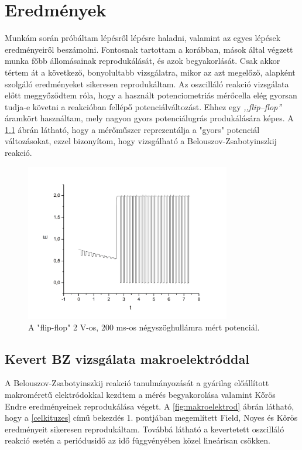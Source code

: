 \chapter{Eredmények}
\pagestyle{headings}

\def\s{0.5}
Munkám során próbáltam lépésről lépésre haladni, valamint az egyes lépések eredményeiről beszámolni. Fontosnak tartottam a korábban, mások által végzett munka főbb állomásainak reprodukálását, és azok begyakorlását. Csak akkor tértem át a következő, bonyolultabb vizsgálatra, mikor az azt megelőző, alapként szolgáló eredményeket sikeresen reprodukáltam. Az oszcilláló reakció vizsgálata előtt meggyőződtem róla, hogy a használt potenciometriás mérőcella elég gyorsan tudja-e követni a reakcióban fellépő potenciálváltozást. Ehhez egy \emph{,,flip--flop''} áramkört használtam, mely nagyon gyors potenciálugrás produkálására képes. A \ref{fig:square} ábrán látható, hogy a mérőműszer reprezentálja a "gyors" potenciál változásokat, ezzel bizonyítom, hogy vizsgálható a Belouszov-Zsabotyinszkij reakció.

\begin{figure}
\centering
\includegraphics[width=0.8\textwidth]{img/square.jpg}
\caption{A "flip-flop" 2 V-os, 200 ms-os négyszöghullámra mért potenciál.}
\label{fig:square}
\end{figure}

\section{Kevert BZ vizsgálata makroelektróddal}
A Belouszov-Zsabotyinszkij reakció tanulmányozását a gyárilag előállított makroméretű elektródokkal kezdtem a mérés begyakorolása valamint Kőrös Endre eredményeinek \cite{noyes1972oscillations} reprodukálása végett. 
A \ref{fig:makroelektrod} ábrán látható, hogy a \ref{celkituzes} című bekezdés 1. pontjában megemlített Field, Noyes és Kőrös eredményeit \cite{noyes1972oscillations} sikeresen reprodukáltam. Továbbá látható a kevertetett oszcilláló reakció esetén a periódusidő az idő függvényében közel lineárisan csökken. 

